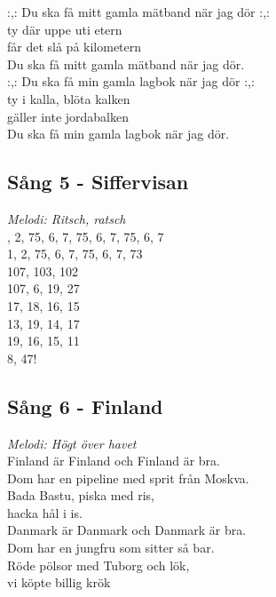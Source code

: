 \documentclass[a5paper]{article}
\begin{document}
\noindent
:,: Du ska få mitt gamla mätband när jag dör :,: \\
ty där uppe uti etern \\
får det slå på kilometern \\
Du ska få mitt gamla mätband när jag dör. \\

\noindent
:,: Du ska få min gamla lagbok när jag dör :,: \\
ty i kalla, blöta kalken \\
gäller inte jordabalken \\
Du ska få min gamla lagbok när jag dör. \\

\subsection{Sång 5 - Siffervisan}
\textit{Melodi: Ritsch, ratsch} \\
	
, 2, 75, 6, 7, 75, 6, 7, 75, 6, 7 \\
1, 2, 75, 6, 7, 75, 6, 7, 73 \\
107, 103, 102 \\
107, 6, 19, 27 \\
17, 18, 16, 15 \\
13, 19, 14, 17 \\
19, 16, 15, 11 \\
8, 47! \\

\newpage

\subsection{Sång 6 - Finland}
\textit{Melodi: Högt över havet} \\

\noindent 
Finland är Finland och Finland är bra. \\
Dom har en pipeline med sprit från Moskva. \\
Bada Bastu, piska med ris, \\
hacka hål i is. \\

\noindent 
Danmark är Danmark och Danmark är bra. \\
Dom har en jungfru som sitter så bar. \\
Röde pölsor med Tuborg och lök, \\
vi köpte billig krök \\
\end{document}
